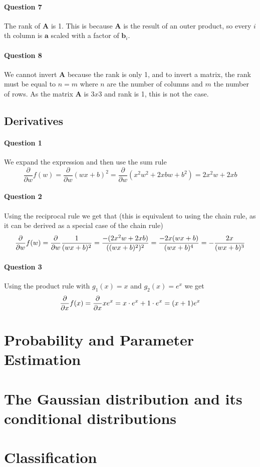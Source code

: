 \documentclass[a4paper, 11pt]{article}
\newcommand{\vect}[1]{\textbf{#1}}
\newcommand{\mat}[1]{\textbf{#1}}
\begin{document}
\paragraph{Question 7}
The rank of $\mat A$ is 1. This is because $\mat A$ is the result of an outer product, so every $i$th column is $\vect a$ scaled with a factor of $\vect b_i$.

\paragraph{Question 8}
We cannot invert $\mat A$ because the rank is only 1, and to invert a matrix, the rank must be equal to $n=m$ where $n$ are the number of columns and $m$ the number of rows. As the matrix $\mat A$ is $3x3$ and rank is 1, this is not the case.

\subsection{Derivatives}
\label{sub:derivatives}

\paragraph{Question 1}
We expand the expression and then use the sum rule
\[
    \frac{\partial}{\partial w}f(w) = \frac{\partial}{\partial w} (wx+b)^2 = \frac{\partial}{\partial w} \left(x^2w^2+2xbw+b^2 \right) = 2x^2w+2xb
\]

\paragraph{Question 2}
Using the reciprocal rule we get that (this is equivalent to using the chain rule, as it can be derived as a special case of the chain rule)
\[
    {\partial \over \partial w} f(w)
    = {\partial \over \partial w} {1 \over (wx+b)^2}
    = {-(2x^2 w + 2xb) \over ((wx+b)^2)^2}
    = {-2x (wx + b) \over (wx+b)^4}
    = - {2x \over (wx + b)^3}
\]

\paragraph{Question 3}
Using the product rule with $g_1(x) = x$ and $g_2(x) = e^x$ we get
\[
    {\partial \over \partial x} f(x)
    = {\partial \over \partial x} x e^x
    = x \cdot e^x + 1 \cdot e^x
    = (x + 1) e^x
\]


\section{Probability and Parameter Estimation}
\label{sec:probability_and_parameter_estimation}

\section{The Gaussian distribution and its conditional distributions} 
\label{sec:the_gaussian_distribution_and_its_conditional_distributions}


\section{Classification}
\label{sec:classification}
\end{document}
